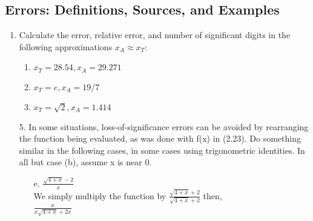 \documentclass[12pt,letterpaper]{article}
\begin{document}
\subsection{Errors: Definitions, Sources, and Examples} 
\begin{enumerate} 
	\item Calculate the error, relative error, and number of significant digits in the following approximations $x_{A} \approx x_{T}$: 
	\begin{enumerate} 
		\item $x_{T} = 28.54, x_{A} = 29.271$ 
		\item $x_{T} = e, x_{A} = 19/7$
		\item $x_{T} = \sqrt{2}, x_{A} = 1.414$ 
	\end{enumerate} 

	\item[5.] In some situations, loss-of-significance errors can be avoided by rearranging the function being evaluated, as was done with f(x) in (2.23). Do something similar in the following cases, in some cases using trigonometric identities. In all but case (b), assume x is near 0. 
	\begin{enumerate}
		\item[e.] $\frac{\sqrt{4+x} - 2}{x}$ \\
			We simply multiply the function by $\frac{\sqrt{4+x} + 2}{\sqrt{4+x} + 2}$ then,  \\
			$\frac{x}{x\sqrt{4+x} + 2x}$ \\ 	
	\end{enumerate} 
\end{enumerate} 
\end{document}

